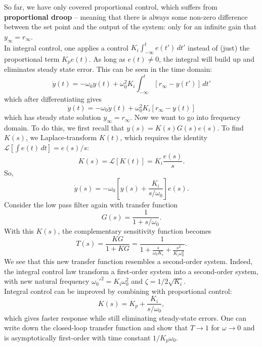 \documentclass{book}
\theoremstyle{definition}
\newcommand{\lag}{\mathcal{L}}
\newcommand{\f}[2]{\frac{#1}{#2}}
\newcommand{\lb}{\left[}
\newcommand{\rb}{\right]}
\begin{document}
So far, we have only covered proportional control, which suffers from \textbf{proportional droop} -- meaning that there is always some non-zero difference between the set point and the output of the system: only for an infinite gain that $y_\infty = r_\infty$. \\


In integral control, one applies a control $K_i \int_{-\infty}^t e(t')\,dt'$ instead of (just) the proportional term $K_p e(t)$. As long as $e(t) \neq 0$, the integral will build up and eliminates steady state error. This can be seen in the time domain:
\begin{equation*}
\dot{y}(t) = -\omega_0 y(t) + \omega_0^2 K_i \int_{-\infty}^t [r_\infty - y(t')]\,dt'
\end{equation*} 
which after differentiating gives
\begin{equation*}
\ddot{y}(t) = -\omega_0\dot{y}(t) + \omega_0^2 K_i [r_\infty - y(t)]
\end{equation*}
which has steady state solution $y_\infty = r_\infty$. Now we want to go into frequency domain. To do this, we first recall that $y(s) = K(s) G(s) e(s)$. To find $K(s)$, we Laplace-transform $K(t)$, which requires the identity $\lag[\int e(t)\,dt] = e(s)/s$:
\begin{equation*}
K(s) = \lag[K(t)] = K_i \f{e(s)}{s}.
\end{equation*}
So,
\begin{equation*}
\dot{y}(s) = -\omega_0 \lb y(s) + \f{K_i}{s/\omega_0} \rb e(s).
\end{equation*}
Consider the low pass filter again with transfer function 
\begin{equation*}
G(s) = \f{1}{1+ s/\omega_0}.
\end{equation*}
With this $K(s)$, the complementary sensitivity function becomes
\begin{equation*}
T(s) = \f{KG}{1+ KG} = \f{1}{1 + \f{s}{\omega_0 K_i} + \f{s^2}{K_i \omega_0^2}}.
\end{equation*}
We see that this new transfer function resembles a second-order system. Indeed, the integral control law transform a first-order system into a second-order system, with new natural frequency ${\omega_0'}^2 = K_i \omega_0^2$ and $\zeta = 1/2\sqrt{K_i}$. \\


Integral control can be improved by combining with proportional control:
\begin{equation*}
K(s)  = K_p + \f{K_i}{s/\omega_0},
\end{equation*}
which gives faster response while still eliminating steady-state errors. One can write down the closed-loop transfer function and show that $T\to 1$ for $\omega\to 0$ and is asymptotically first-order with time constant $1/K_p \omega_0$. \\
\end{document}

